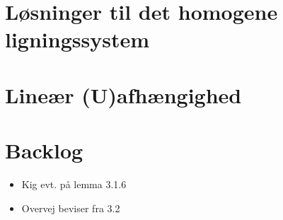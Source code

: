 \section{Løsninger til det homogene ligningssystem}
\hypertarget{1.2.13}{}


\section{Lineær (U)afhængighed}




\hypertarget{2.2.15}{}



\hypertarget{3.1.4}{}


\section{Backlog}
\begin{itemize}
	\item Kig evt. på lemma 3.1.6
	\item Overvej beviser fra 3.2
\end{itemize}
